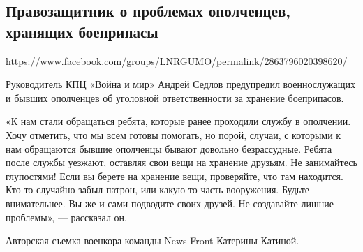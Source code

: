  
 
  
\subsection{Правозащитник о проблемах ополченцев, хранящих боеприпасы}
\label{sec:21_07_2020.fb.lnr.19}
\url{https://www.facebook.com/groups/LNRGUMO/permalink/2863796020398620/}


Руководитель КПЦ «Война и мир» Андрей Седлов предупредил военнослужащих и
бывших ополченцев об уголовной ответственности за хранение боеприпасов.

«К нам стали обращаться ребята, которые ранее проходили службу в ополчении.
Хочу отметить, что мы всем готовы помогать, но порой, случаи, с которыми к нам
обращаются бывшие ополченцы бывают довольно безрассудные. Ребята после службы
уезжают, оставляя свои вещи на хранение друзьям. Не занимайтесь глупостями!
Если вы берете на хранение вещи, проверяйте, что там находится. Кто-то случайно
забыл патрон, или какую-то часть вооружения. Будьте внимательнее. Вы же и сами
подводите своих друзей. Не создавайте лишние проблемы», --- рассказал он.

Авторская съемка военкора команды News Front Катерины Катиной.
